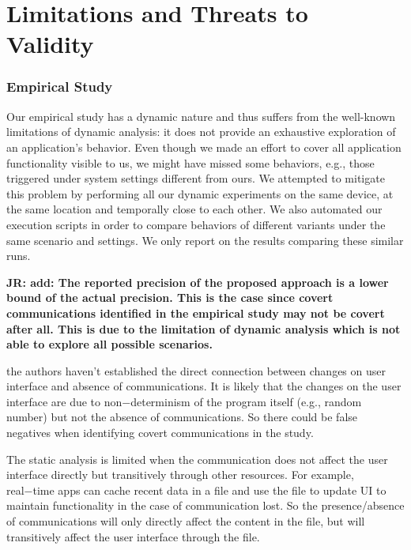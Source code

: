 \vspace{0.05in}
\vspace{-0.1in}
\section{Limitations and Threats to \\Validity}
\label{sec:limitations}

\subsubsection{Empirical Study}
Our empirical study has a dynamic nature and thus suffers from the well-known limitations of dynamic analysis: it does not provide an exhaustive exploration of an application's behavior.
Even though we made an effort to cover all application functionality visible to us, we might have missed some behaviors, e.g., those triggered under system settings different from ours. 
We attempted to mitigate this problem by performing all our dynamic experiments on the same device, at the same location and temporally close to each other.  
We also automated our execution scripts in order to compare behaviors of different variants under the same scenario and settings. 
We only report on the results comparing these similar runs.  

{\bf JR: add: The reported precision of the proposed approach is a lower bound of the actual
precision. This is the case since covert communications identified in
the empirical study may not be covert after all. This is due to the
limitation of dynamic analysis which is not able to explore all possible
scenarios.

the authors haven't established the
direct connection between changes on user interface and absence
of communications. It is likely that the changes on the user
interface are due to non−determinism of the program itself
(e.g., random number) but not the absence of communications. So
there could be false negatives when identifying covert
communications in the study.

The static analysis is limited when the communication does not
affect the user interface directly but transitively through
other resources. For example, real−time apps can cache recent
data in a file and use the file to update UI to maintain
functionality in the case of communication lost. So the
presence/absence of communications will only directly affect
the content in the file, but will transitively affect the user
interface through the file.}

